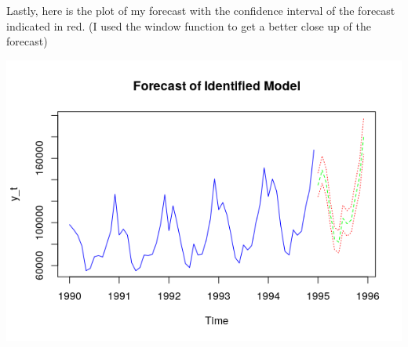 \documentclass[11pt]{article}
\begin{document}
Lastly, here is the plot of my forecast with the confidence interval of the forecast indicated in red. (I used the window function to get a better close up of the forecast)
\begin{center}
\includegraphics[scale=1]{1h}
\end{center}
\end{document}
